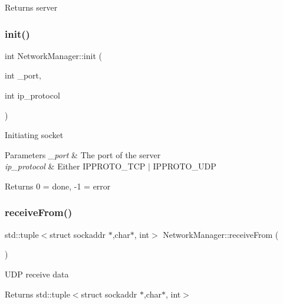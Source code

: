 \begin{DoxyReturn}{Returns}
server 
\end{DoxyReturn}
\mbox{\label{classNetworkManager_a4ac57f20b56fc1a2898eb9a1f5c7900b}} 
\subsubsection{\texorpdfstring{init()}{init()}}
{\footnotesize\ttfamily int Network\+Manager\+::init (\begin{DoxyParamCaption}\item[{int}]{\+\_\+port,  }\item[{int}]{ip\+\_\+protocol }\end{DoxyParamCaption})}

Initiating socket 
\begin{DoxyParams}{Parameters}
{\em \+\_\+port} & The port of the server \\
\hline
{\em ip\+\_\+protocol} & Either I\+P\+P\+R\+O\+T\+O\+\_\+\+T\+CP $\vert$ I\+P\+P\+R\+O\+T\+O\+\_\+\+U\+DP \\
\hline
\end{DoxyParams}
\begin{DoxyReturn}{Returns}
0 = done, -\/1 = error 
\end{DoxyReturn}
\mbox{\label{classNetworkManager_a07057dcbe4af4740383384daf8289d5f}} 
\subsubsection{\texorpdfstring{receiveFrom()}{receiveFrom()}}
{\footnotesize\ttfamily std\+::tuple$<$struct sockaddr $\ast$,char$\ast$, int$>$ Network\+Manager\+::receive\+From (\begin{DoxyParamCaption}{ }\end{DoxyParamCaption})}

U\+DP receive data \begin{DoxyReturn}{Returns}
std\+::tuple$<$struct sockaddr $\ast$,char$\ast$, int$>$ 
\end{DoxyReturn}
\mbox{\label{classNetworkManager_a8c7c31a6fdbc5ed52f8d3bddf16a84e6}} 
